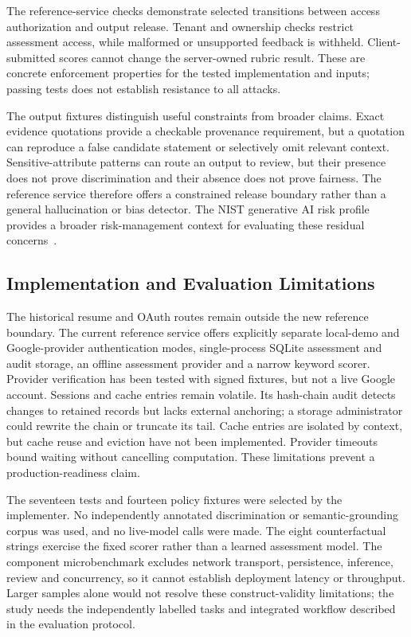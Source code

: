 \documentclass[conference]{IEEEtran}
\begin{document}
The reference-service checks demonstrate selected transitions between access authorization and output release. Tenant and ownership checks restrict assessment access, while malformed or unsupported feedback is withheld. Client-submitted scores cannot change the server-owned rubric result. These are concrete enforcement properties for the tested implementation and inputs; passing tests does not establish resistance to all attacks.

The output fixtures distinguish useful constraints from broader claims. Exact evidence quotations provide a checkable provenance requirement, but a quotation can reproduce a false candidate statement or selectively omit relevant context. Sensitive-attribute patterns can route an output to review, but their presence does not prove discrimination and their absence does not prove fairness. The reference service therefore offers a constrained release boundary rather than a general hallucination or bias detector. The NIST generative AI risk profile provides a broader risk-management context for evaluating these residual concerns~\cite{nist2024genai}.

\subsection{Implementation and Evaluation Limitations}

The historical resume and OAuth routes remain outside the new reference boundary. The current reference service offers explicitly separate local-demo and Google-provider authentication modes, single-process SQLite assessment and audit storage, an offline assessment provider and a narrow keyword scorer. Provider verification has been tested with signed fixtures, but not a live Google account. Sessions and cache entries remain volatile. Its hash-chain audit detects changes to retained records but lacks external anchoring; a storage administrator could rewrite the chain or truncate its tail. Cache entries are isolated by context, but cache reuse and eviction have not been implemented. Provider timeouts bound waiting without cancelling computation. These limitations prevent a production-readiness claim.

The seventeen tests and fourteen policy fixtures were selected by the implementer. No independently annotated discrimination or semantic-grounding corpus was used, and no live-model calls were made. The eight counterfactual strings exercise the fixed scorer rather than a learned assessment model. The component microbenchmark excludes network transport, persistence, inference, review and concurrency, so it cannot establish deployment latency or throughput. Larger samples alone would not resolve these construct-validity limitations; the study needs the independently labelled tasks and integrated workflow described in the evaluation protocol.
\end{document}
